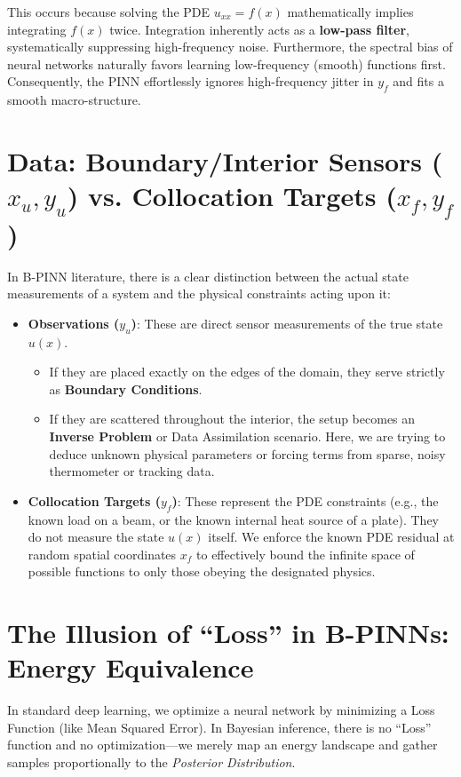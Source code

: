 \documentclass[11pt, a4paper]{article}
\begin{document}
This occurs because solving the PDE $u_{xx} = f(x)$ mathematically implies integrating $f(x)$ twice. Integration inherently acts as a \textbf{low-pass filter}, systematically suppressing high-frequency noise. Furthermore, the spectral bias of neural networks naturally favors learning low-frequency (smooth) functions first. Consequently, the PINN effortlessly ignores high-frequency jitter in $y_f$ and fits a smooth macro-structure.

\section{Data: Boundary/Interior Sensors ($x_u, y_u$) vs. Collocation Targets ($x_f, y_f$)}

In B-PINN literature, there is a clear distinction between the actual state measurements of a system and the physical constraints acting upon it:

\begin{itemize}
    \item \textbf{Observations ($y_u$)}: These are direct sensor measurements of the true state $u(x)$. 
    \begin{itemize}
        \item If they are placed exactly on the edges of the domain, they serve strictly as \textbf{Boundary Conditions}.
        \item If they are scattered throughout the interior, the setup becomes an \textbf{Inverse Problem} or Data Assimilation scenario. Here, we are trying to deduce unknown physical parameters or forcing terms from sparse, noisy thermometer or tracking data.
    \end{itemize}
    \item \textbf{Collocation Targets ($y_f$)}: These represent the PDE constraints (e.g., the known load on a beam, or the known internal heat source of a plate). They do not measure the state $u(x)$ itself. We enforce the known PDE residual at random spatial coordinates $x_f$ to effectively bound the infinite space of possible functions to only those obeying the designated physics.
\end{itemize}

\section{The Illusion of ``Loss'' in B-PINNs: Energy Equivalence}

In standard deep learning, we optimize a neural network by minimizing a Loss Function (like Mean Squared Error). In Bayesian inference, there is no ``Loss'' function and no optimization—we merely map an energy landscape and gather samples proportionally to the \textit{Posterior Distribution}.
\end{document}
